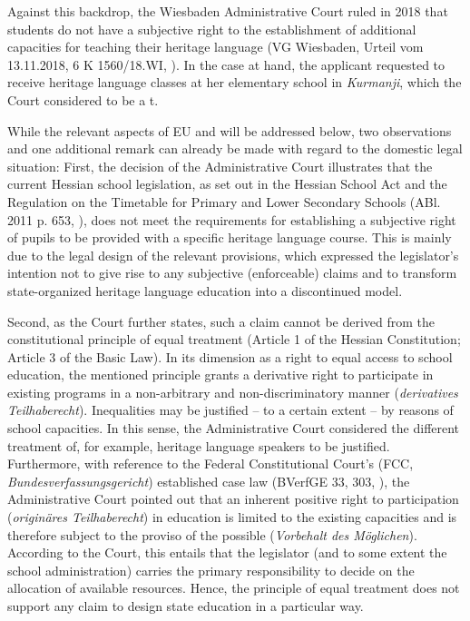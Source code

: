 \documentclass[output=paper,colorlinks,citecolor=brown]{langscibook}
\begin{document}
Against this backdrop, the Wiesbaden Administrative Court ruled in 2018 that students do not have a subjective right to the establishment of additional capacities for teaching their heritage language (VG Wiesbaden, Urteil vom 13.11.2018, 6 K 1560/18.WI, \citealt{vg_wiesbaden2019}). In the case at hand, the applicant requested to receive heritage language classes at her elementary school in \textit{Kurmanji},  which the Court considered to be a  t. 

While the relevant aspects of EU and  will be addressed below, two observations and one additional remark can already be made with regard to the domestic legal situation: First, the decision of the Administrative Court illustrates that the current Hessian school legislation, as set out in the Hessian School Act and the Regulation on the Timetable for Primary and Lower Secondary Schools (ABl. 2011 p. 653, \citealt{abl2011}), does not meet the requirements for establishing a subjective right of pupils to be provided with a specific heritage language course. This is mainly due to the legal design of the relevant provisions, which expressed the legislator's intention not to give rise to any subjective (enforceable) claims and to transform state-organized heritage language education into a discontinued model.

Second, as the Court further states, such a claim cannot be derived from the constitutional principle of equal treatment (Article 1 of the Hessian Constitution; Article 3 of the Basic Law). In its dimension as a right to equal access to school education, the mentioned principle grants a derivative right to participate in existing programs in a non-arbitrary and non-discriminatory manner (\textit{derivatives Teilhaberecht}). Inequalities may be justified -- to a certain extent -- by reasons of school capacities. In this sense, the Administrative Court considered the different treatment of, for example,  heritage language speakers to be justified. Furthermore, with reference to the Federal Constitutional Court's (FCC, \textit{Bundesverfassungsgericht}) established case law (BVerfGE 33, 303, \citealt{bverfge1972}), the Administrative Court pointed out that an inherent positive right to participation (\textit{originäres Teilhaberecht}) in education is limited to the existing capacities and is therefore subject to the proviso of the possible (\textit{Vorbehalt des Möglichen}). According to the Court, this entails that the legislator (and to some extent the school administration) carries the primary responsibility to decide on the allocation of available resources. Hence, the principle of equal treatment does not support any claim to design state education in a particular way.
\end{document}
